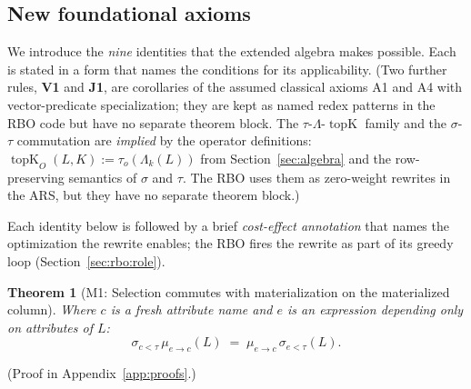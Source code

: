 \documentclass[sigconf]{acmart}
\theoremstyle{plain}
\newtheorem{theorem}{Theorem}
\theoremstyle{definition}
\newcommand{\topK}{\operatorname{topK}}
\theoremstyle{remark}
\begin{document}
\subsection{New foundational axioms}\label{sec:equational:new}

We introduce the \emph{nine} identities that the extended algebra
makes possible. Each is stated in a form that names the conditions
for its applicability. (Two further rules, \textbf{V1} and
\textbf{J1}, are corollaries of the assumed classical axioms
A1 and A4 with vector-predicate specialization; they are kept as
named redex patterns in the RBO code but have no separate theorem
block. The $\tau$-$\Lambda$-$\topK$ family and the
$\sigma$-$\tau$ commutation are \emph{implied} by the operator
definitions: $\topK_O(L, K):= \tau_o(\Lambda_k(L))$ from
Section~\ref{sec:algebra} and the row-preserving semantics of
$\sigma$ and $\tau$. The RBO uses them as zero-weight rewrites in
the ARS, but they have no separate theorem block.)

Each identity below is followed by a brief \emph{cost-effect
annotation} that names the optimization the rewrite enables; the
RBO fires the rewrite as part of its greedy loop
(Section~\ref{sec:rbo:role}).

\begin{theorem}[M1: Selection commutes with materialization on the materialized column]\label{thm:m1}
Where $c$ is a fresh attribute name and $e$ is an expression
depending only on attributes of $L$:
\[
\sigma_{c < \tau}\, \mu_{e \to c}(L) \;=\; \mu_{e \to c}\, \sigma_{e < \tau}(L).
\]
\end{theorem}

  (Proof in Appendix~\ref{app:proofs}.)
\end{document}
